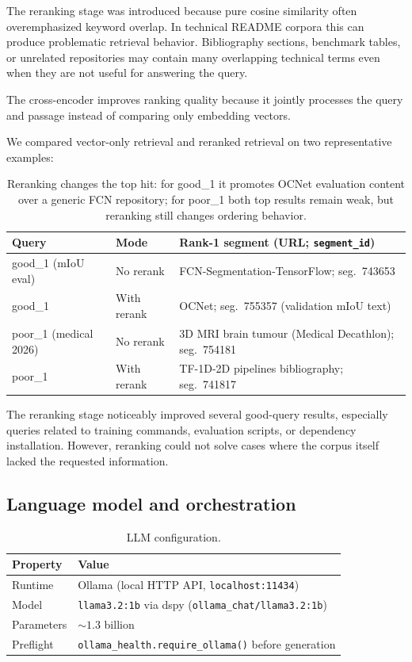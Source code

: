 \documentclass[11pt,a4paper]{article}
\begin{document}
The reranking stage was introduced because pure cosine similarity often overemphasized keyword overlap. In technical README corpora this can produce problematic retrieval behavior. Bibliography sections, benchmark tables, or unrelated repositories may contain many overlapping technical terms even when they are not useful for answering the query.

The cross-encoder improves ranking quality because it jointly processes the query and passage instead of comparing only embedding vectors.

We compared vector-only retrieval and reranked retrieval on two representative examples:

\begin{table}[ht]
\centering
\scriptsize
\begin{tabular}{llp{5.8cm}}
\toprule
Query & Mode & Rank-1 segment (URL; \texttt{segment\_id}) \\
\midrule
good\_1 (mIoU eval) & No rerank & FCN-Segmentation-TensorFlow; seg.\ 743653 \\
good\_1 & With rerank & OCNet; seg.\ 755357 (validation mIoU text) \\
poor\_1 (medical 2026) & No rerank & 3D MRI brain tumour (Medical Decathlon); seg.\ 754181 \\
poor\_1 & With rerank & TF-1D-2D pipelines bibliography; seg.\ 741817 \\
\bottomrule
\end{tabular}
\caption{Reranking changes the top hit: for good\_1 it promotes OCNet evaluation content over a generic FCN repository; for poor\_1 both top results remain weak, but reranking still changes ordering behavior.}
\label{tab:rerank-ablation}
\end{table}

The reranking stage noticeably improved several good-query results, especially queries related to training commands, evaluation scripts, or dependency installation. However, reranking could not solve cases where the corpus itself lacked the requested information.

\subsection{Language model and orchestration}

\begin{table}[ht]
\centering
\small
\begin{tabular}{ll}
\toprule
Property & Value \\
\midrule
Runtime & Ollama (local HTTP API, \texttt{localhost:11434}) \\
Model & \texttt{llama3.2:1b} via dspy (\texttt{ollama\_chat/llama3.2:1b}) \\
Parameters & \(\sim 1.3\) billion \\
Preflight & \texttt{ollama\_health.require\_ollama()} before generation \\
\bottomrule
\end{tabular}
\caption{LLM configuration.}
\label{tab:llm}
\end{table}
\end{document}
